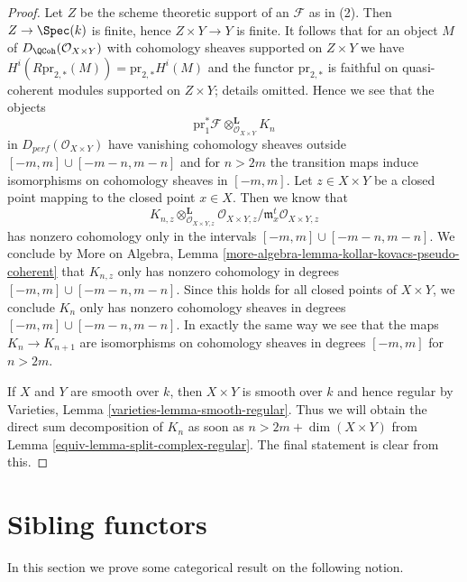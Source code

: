 \begin{proof}

Let $Z$ be the scheme theoretic support of an $\mathcal{F}$ as in (2).
Then $Z \to \Spec(k)$ is finite, hence $Z \times Y \to Y$ is finite.
It follows that for an object $M$ of $D_\QCoh(\mathcal{O}_{X \times Y})$
with cohomology sheaves supported on $Z \times Y$ we have
$H^i(R\text{pr}_{2, *}(M)) = \text{pr}_{2, *}H^i(M)$ and the functor
$\text{pr}_{2, *}$ is faithful on quasi-coherent modules supported
on $Z \times Y$; details omitted. Hence we see that the objects
$$
\text{pr}_1^*\mathcal{F} \otimes_{\mathcal{O}_{X \times Y}}^\mathbf{L} K_n
$$
in $D_{perf}(\mathcal{O}_{X \times Y})$ have vanishing cohomology sheaves
outside $[-m, m] \cup [-m - n, m - n]$ and for $n > 2m$ the transition maps
induce isomorphisms on cohomology sheaves in $[-m, m]$.
Let $z \in X \times Y$ be a closed point mapping to the closed point
$x \in X$. Then we know that
$$
K_{n, z} \otimes_{\mathcal{O}_{X \times Y, z}}^\mathbf{L}
\mathcal{O}_{X \times Y, z}/\mathfrak m_x^t\mathcal{O}_{X \times Y, z}
$$
has nonzero cohomology only in the intervals
$[-m, m] \cup [-m - n, m - n]$.
We conclude by More on Algebra, Lemma
\ref{more-algebra-lemma-kollar-kovacs-pseudo-coherent}
that $K_{n, z}$ only has nonzero cohomology
in degrees $[-m, m] \cup [-m - n, m - n]$. Since this holds for all
closed points of $X \times Y$, we conclude $K_n$ only has nonzero
cohomology sheaves in degrees $[-m, m] \cup [-m - n, m - n]$.
In exactly the same way we see that the maps $K_n \to K_{n + 1}$
are isomorphisms on cohomology sheaves in degrees $[-m, m]$
for $n > 2m$.

\medskip\noindent
If $X$ and $Y$ are smooth over $k$, then $X \times Y$ is smooth
over $k$ and hence regular by
Varieties, Lemma \ref{varieties-lemma-smooth-regular}.
Thus we will obtain the direct sum decomposition of $K_n$
as soon as $n > 2m + \dim(X \times Y)$ from
Lemma \ref{equiv-lemma-split-complex-regular}. The final statement
is clear from this.
\end{proof}

\section{Sibling functors}
\label{equiv-section-sibling}
In this section we prove some categorical result on the following notion.

